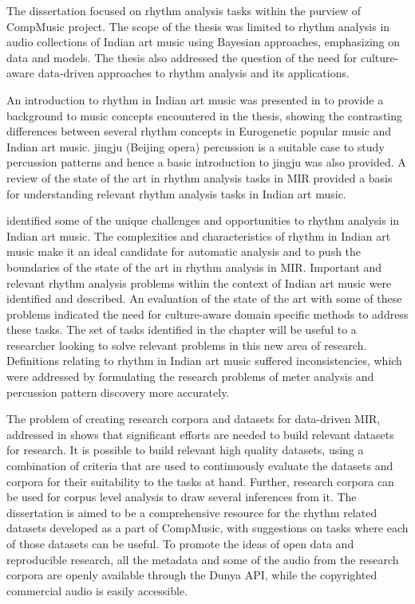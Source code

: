 The dissertation focused on rhythm analysis tasks within the purview of CompMusic project. The scope of the thesis was limited to rhythm analysis in audio collections of Indian art music using Bayesian approaches, emphasizing on data and models. The thesis also addressed the question of the need for culture-aware data-driven approaches to rhythm analysis and its applications. 

An introduction to rhythm in Indian art music was presented in  to provide a background to music concepts encountered in the thesis, showing the contrasting differences between several rhythm concepts in Eurogenetic popular music and Indian art music. \Gls{jingju} (Beijing opera) percussion is a suitable case to study percussion patterns and hence a basic introduction to \gls{jingju} was also provided. A review of the state of the art in rhythm analysis tasks in \gls{MIR} provided a basis for understanding relevant rhythm analysis tasks in Indian art music. 

 identified some of the unique challenges and opportunities to rhythm analysis in Indian art music. The complexities and characteristics of rhythm in Indian art music make it an ideal candidate for automatic analysis and to push the boundaries of the state of the art in rhythm analysis in \gls{MIR}. Important and relevant rhythm analysis problems within the context of Indian art music were identified and described. An evaluation of the state of the art with some of these problems indicated the need for culture-aware domain specific methods to address these tasks. The set of tasks identified in the chapter will be useful to a researcher looking to solve relevant problems in this new area of research. Definitions relating to rhythm in Indian art music suffered inconsistencies, which were addressed by formulating the research problems of meter analysis and percussion pattern discovery more accurately.

The problem of creating research corpora and datasets for data-driven \gls{MIR}, addressed in  shows that significant efforts are needed to build relevant datasets for research. It is possible to build relevant high quality datasets, using a combination of criteria that are used to continuously evaluate the datasets and corpora for their suitability to the tasks at hand. Further, research corpora can be used for corpus level analysis to draw several inferences from it. The dissertation is aimed to be a comprehensive resource for the rhythm related datasets developed as a part of CompMusic, with suggestions on tasks where each of those datasets can be useful. To promote the ideas of open data and reproducible research, all the metadata and some of the audio from the research corpora are openly available through the Dunya API, while the copyrighted commercial audio is easily accessible.


